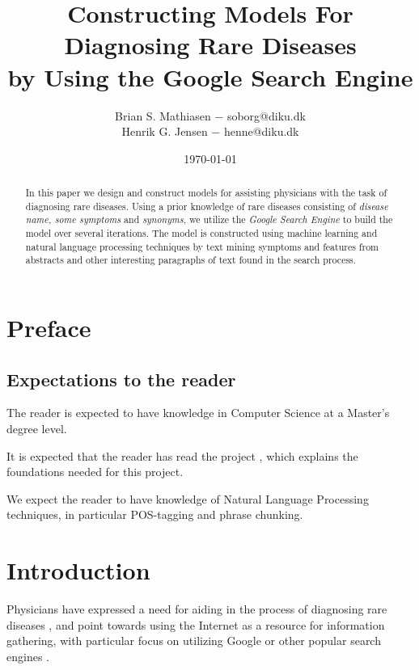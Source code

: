 \documentclass[10pt,letterpaper,final]{article}
\title{Constructing Models For Diagnosing Rare Diseases\\
        \small{by Using the Google Search Engine}}
\author{Brian S. Mathiasen $-$ soborg@diku.dk \\
        Henrik G. Jensen $-$ henne@diku.dk\\
}
\date{\today} %
\begin{document}
\maketitle
\listoffixmes


\begin{abstract}
In this paper we design and construct models for assisting physicians
with the task of diagnosing rare diseases. Using a prior knowledge of
rare diseases consisting of \textit{disease name, some symptoms} and
\textit{synonyms}, we utilize the \textit{Google Search Engine} to build
the model over several iterations. The model is constructed using
machine learning and natural language processing techniques by text
mining symptoms and features from abstracts and other interesting
paragraphs of text found in the search process.

\end{abstract}

\section{Preface}
\subsection{Expectations to the reader}
The reader is expected to have knowledge in Computer Science at a
Master's degree level.

It is expected that the reader has read the project
\cite{jensenandersen}, which explains the foundations needed for this
project.

We expect the reader to have knowledge of Natural Language Processing
techniques, in particular POS-tagging and phrase chunking.


\section{Introduction}
\label{chap:introduction}
Physicians have expressed a need for aiding in the process of diagnosing
rare diseases \cite{googlingdiagnosis}, and point towards using the
Internet as a resource for information gathering, with particular focus
on utilizing Google or other popular search engines
\cite{googlechangemedicine} \cite{diagnosissearchengines}.

\end{document}
